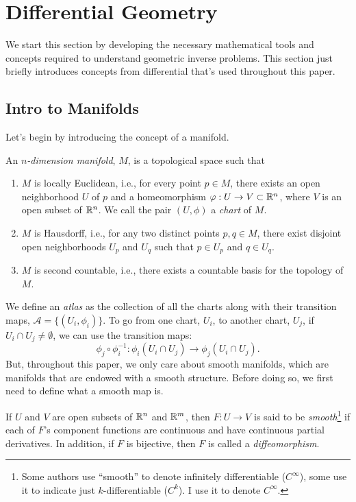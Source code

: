 \section{Differential Geometry}
\label{sec:differential_geometry}

We start this section by developing the necessary mathematical tools and concepts required to understand geometric inverse problems. This section just briefly introduces concepts from differential that's used throughout this paper.

\subsection{Intro to Manifolds} Let's begin by introducing the concept of a manifold.
\begin{definition}
  An \emph{$n$-dimension manifold}, $M$, is a topological space such that
  \begin{enumerate}
    \item $M$ is locally Euclidean, i.e., for every point $p \in M$, there exists an open neighborhood $U$ of $p$ and a homeomorphism $\varphi : U \rightarrow V \subset \mathbb{R}^n$, where $V$ is an open subset of $\mathbb{R}^n$. We call the pair $(U, \phi)$ a \emph{chart} of $M$.
    \item $M$ is Hausdorff, i.e., for any two distinct points $p, q \in M$, there exist disjoint open neighborhoods $U_p$ and $U_q$ such that $p \in U_p$ and $q \in U_q$.
    \item $M$ is second countable, i.e., there exists a countable basis for the topology of $M$.
  \end{enumerate}
\end{definition}
We define an \textit{atlas} as the collection of all the charts along with their transition maps, $\mathcal{A} = \{(U_i, \phi_i)\}$. To go from one chart, $U_i$, to another chart, $U_j$, if $U_i \cap U_j \ne \emptyset$, we can use the transition maps:
\[%
  \phi_j \circ \phi_i^{-1} : \phi_i(U_i \cap U_j) \to \phi_j(U_i \cap U_j)
.\]%
But, throughout this paper, we only care about smooth manifolds, which are manifolds that are endowed with a smooth structure. Before doing so, we first need to define what a smooth map is.
\begin{definition}
  If $U$ and $V$ are open subsets of $\mathbb{R}^n$ and $\mathbb{R}^m$, then $F : U \to V$ is said to be \emph{smooth}\footnote{Some authors use ``smooth'' to denote infinitely differentiable ($C^\infty$), some use it to indicate just $k$-differentiable ($C^k$). I use it to denote $C^\infty$.} if each of $F$'s component functions are continuous and have continuous partial derivatives. In addition, if $F$ is bijective, then $F$ is called a \emph{diffeomorphism}.
\end{definition}
